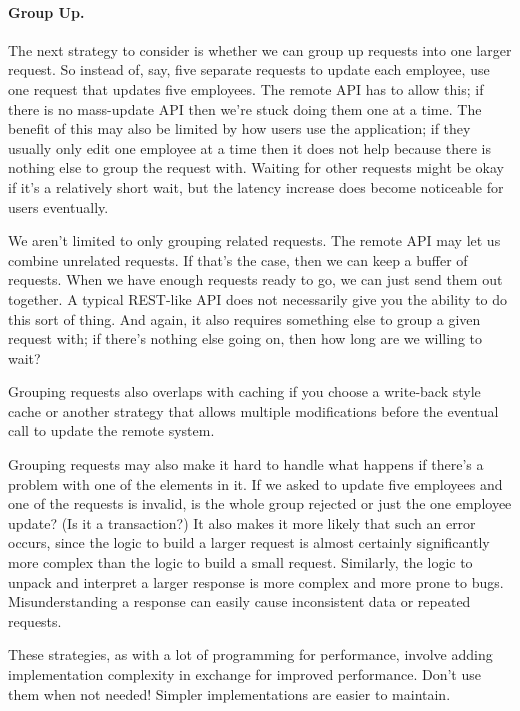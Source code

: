 \paragraph{Group Up.}
The next strategy to consider is whether we can group up requests into one larger request. So instead of, say, five separate requests to update each employee, use one request that updates five employees. The remote API has to allow this; if there is no mass-update API then we're stuck doing them one at a time. The benefit of this may also be limited by how users use the application; if they usually only edit one employee at a time then it does not help because there is nothing else to group the request with. Waiting for other requests might be okay if it's a relatively short wait, but the latency increase does become noticeable for users eventually.

We aren't limited to only grouping related requests. The remote API may let us combine unrelated requests. If that's the case, then we can keep a buffer of requests. When we have enough requests ready to go, we can just send them out together. A typical REST-like API does not necessarily give you the ability to do this sort of thing.    And again, it also requires something else to group a given request with; if there's nothing else going on, then how long are we willing to wait?

Grouping requests also overlaps with caching if you choose a write-back style cache or another strategy that allows multiple modifications before the eventual call to update the remote system. 

Grouping requests may also make it hard to handle what happens if there's a problem with one of the elements in it. If we asked to update five employees and one of the requests is invalid, is the whole group rejected or just the one employee update? (Is it a transaction?) It also makes it more likely that such an error occurs, since the logic to build a larger request is almost certainly significantly more complex than the logic to build a small request. Similarly, the logic to unpack and interpret a larger response is more complex and more prone to bugs. Misunderstanding a response can easily cause inconsistent data or repeated requests.

These strategies, as with a lot of programming for performance, involve adding implementation complexity in exchange for improved performance. Don't use them when not needed! Simpler implementations are easier to maintain.


